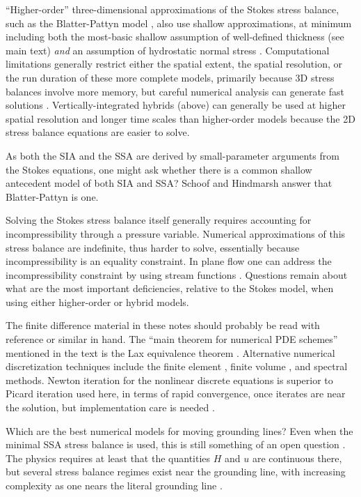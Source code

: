 \documentclass[letterpaper,final,12pt,reqno]{amsart}
\begin{document}
``Higher-order'' three-dimensional approximations of the Stokes stress balance, such as the Blatter-Pattyn model \cite{Blatter,Pattyn03}, also use shallow approximations, at minimum including both the most-basic shallow assumption of well-defined thickness (see main text) \emph{and} an assumption of hydrostatic normal stress \cite{GreveBlatter2009}.  Computational limitations generally restrict either the spatial extent, the spatial resolution, or the run duration of these more complete models, primarily because 3D stress balances involve more memory, but careful numerical analysis can generate fast solutions \cite{Brown2013}.  Vertically-integrated hybrids (above) can generally be used at higher spatial resolution and longer time scales than higher-order models because the 2D stress balance equations are easier to solve.

As both the SIA and the SSA are derived by small-parameter arguments from the Stokes equations, one might ask whether there is a common shallow antecedent model of both SIA and SSA?  Schoof and Hindmarsh \cite{SchoofHindmarsh} answer that Blatter-Pattyn is one.

Solving the Stokes stress balance itself \cite{JouvetRappaz2011,Lengetal2012,ISMIPHOM} generally requires accounting for incompressibility through a pressure variable.  Numerical approximations of this stress balance are indefinite, thus harder to solve, essentially because incompressibility is an equality constraint.  In plane flow one can address the incompressibility constraint by using stream functions \cite{BaliseRaymond1985}.  Questions remain about what are the most important deficiencies, relative to the Stokes model, when using either higher-order \cite{ISMIPHOM} or hybrid models.

The finite difference material in these notes should probably be read with reference \cite{MortonMayers} or similar in hand.  The ``main theorem for numerical PDE schemes'' mentioned in the text is the Lax equivalence theorem \cite{MortonMayers}.  Alternative numerical discretization techniques include the finite element \cite{Braess}, finite volume \cite{LeVeque}, and spectral \cite{Trefethen} methods.  Newton iteration for the nonlinear discrete equations is superior to Picard iteration used here, in terms of rapid convergence, once iterates are near the solution, but implementation care is needed \cite{Kelley}.

Which are the best numerical models for moving grounding lines?  Even when the minimal SSA stress balance is used, this is still something of an open question \cite{Feldmannetal2014,Goldbergetal2009,MISMIP3d2013,MISMIP2012,SchoofMarine1}.  The physics requires at least that the quantities $H$ and $u$ are continuous there, but several stress balance regimes exist near the grounding line, with increasing complexity as one nears the literal grounding line \cite{SchoofMarine2}.
\end{document}
